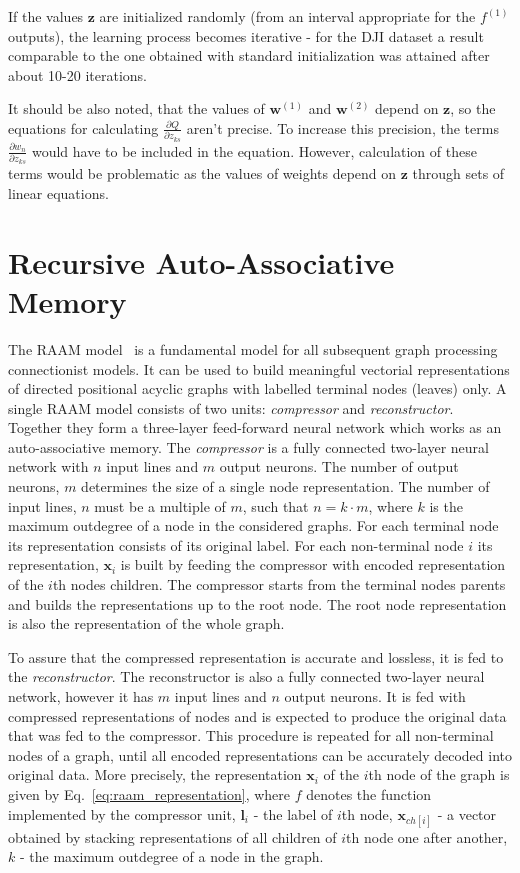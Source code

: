 \documentclass[]{spie}  %
\newcommand{\bm}[1]{\boldsymbol{#1}}
\begin{document}
If the values $\bm{z}$ are initialized randomly (from an interval appropriate for the $f^{(1)}$ outputs), the learning process becomes iterative - for the DJI dataset a result comparable to the one obtained with standard initialization was attained after about 10-20 iterations.

It should be also noted, that the values of $\bm{w}^{(1)}$ and $\bm{w}^{(2)}$ depend on $\bm{z}$, so the equations for calculating $\frac{\partial Q}{\partial z_{ks}}$ aren't precise. To increase this precision, the terms $\frac{\partial w_n}{\partial z_{ks}}$ would have to be included in the equation. However, calculation of these terms would be problematic as the values of weights depend on $\bm{z}$ through sets of linear equations.




\section{Recursive Auto-Associative Memory}
The RAAM model~\cite{pollack1990recursive} is a fundamental model for all subsequent graph processing connectionist models. It can be used to build meaningful vectorial representations of directed positional acyclic graphs with labelled terminal nodes (leaves) only. A single RAAM model consists of two units: \emph{compressor} and \emph{reconstructor}. Together they form a three-layer feed-forward neural network which works as an auto-associative memory. The \emph{compressor} is a fully connected two-layer neural network with $n$ input lines and $m$ output neurons. The number of output neurons, $m$ determines the size of a single node representation. The number of input lines, $n$ must be a multiple of $m$, such that $n = k \cdot m$, where $k$ is the maximum outdegree of a node in the considered graphs. For each terminal node its representation consists of its original label. For each non-terminal node $i$ its representation, $\bm{x}_i$ is built by feeding the compressor with encoded representation of the $i$th nodes children. The compressor starts from the terminal nodes parents and builds the representations up to the root node. The root node representation is also the representation of the whole graph.

To assure that the compressed representation is accurate and lossless, it is fed to the \emph{reconstructor}. The reconstructor is also a fully connected two-layer neural network, however it has $m$ input lines and $n$ output neurons. It is fed with compressed representations of nodes and is expected to produce the original data that was fed to the compressor. This procedure is repeated for all non-terminal nodes of a graph, until all encoded representations can be accurately decoded into original data. More precisely, the representation $\bm{x}_i$ of the $i$th node of the graph is given by Eq.~\ref{eq:raam_representation}, where $f$ denotes the function implemented by the compressor unit, $\bm{l}_i$ - the label of $i$th node, $\bm{x}_{ch[i]}$ - a vector obtained by stacking representations of all children of $i$th node one after another, $k$ - the maximum outdegree of a node in the graph.
\end{document}
